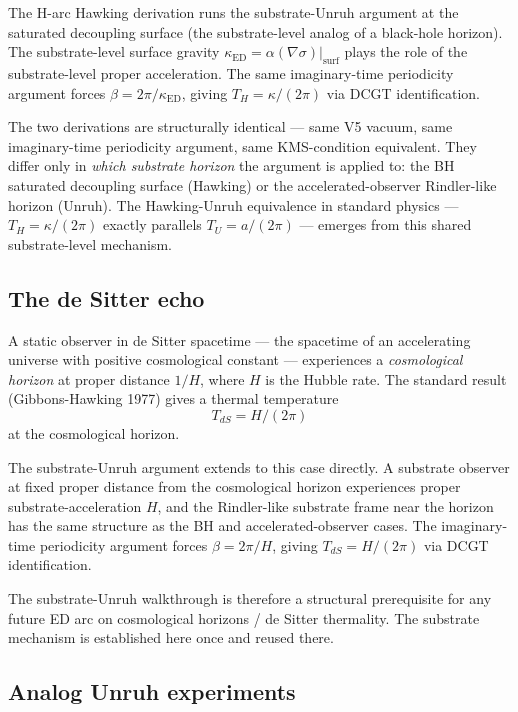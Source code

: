 \documentclass[11pt,a4paper]{article}
\begin{document}
The H-arc Hawking derivation runs the substrate-Unruh argument at the saturated decoupling surface (the substrate-level analog of a black-hole horizon). The substrate-level surface gravity $\kappa_{\mathrm{ED}} = \alpha(\nabla\sigma)|_{\mathrm{surf}}$ plays the role of the substrate-level proper acceleration. The same imaginary-time periodicity argument forces $\beta = 2\pi/\kappa_{\mathrm{ED}}$, giving $T_H = \kappa/(2\pi)$ via DCGT identification.

The two derivations are structurally identical --- same V5 vacuum, same imaginary-time periodicity argument, same KMS-condition equivalent. They differ only in \emph{which substrate horizon} the argument is applied to: the BH saturated decoupling surface (Hawking) or the accelerated-observer Rindler-like horizon (Unruh). The Hawking-Unruh equivalence in standard physics --- $T_H = \kappa/(2\pi)$ exactly parallels $T_U = a/(2\pi)$ --- emerges from this shared substrate-level mechanism.

\subsection{The de Sitter echo}

A static observer in de Sitter spacetime --- the spacetime of an accelerating universe with positive cosmological constant --- experiences a \emph{cosmological horizon} at proper distance $1/H$, where $H$ is the Hubble rate. The standard result (Gibbons-Hawking 1977) gives a thermal temperature
\[
T_{dS} = H / (2\pi)
\]
at the cosmological horizon.

The substrate-Unruh argument extends to this case directly. A substrate observer at fixed proper distance from the cosmological horizon experiences proper substrate-acceleration $H$, and the Rindler-like substrate frame near the horizon has the same structure as the BH and accelerated-observer cases. The imaginary-time periodicity argument forces $\beta = 2\pi/H$, giving $T_{dS} = H/(2\pi)$ via DCGT identification.

The substrate-Unruh walkthrough is therefore a structural prerequisite for any future ED arc on cosmological horizons / de Sitter thermality. The substrate mechanism is established here once and reused there.

\subsection{Analog Unruh experiments}
\end{document}
